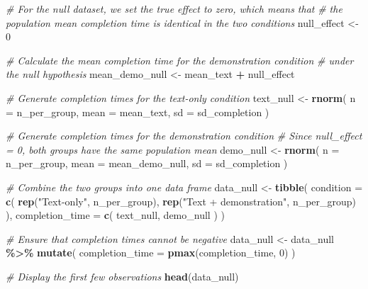 \documentclass[
]{article}
\newenvironment{Shaded}{\begin{snugshade}}{\end{snugshade}}
\newcommand{\AttributeTok}[1]{\textcolor[rgb]{0.13,0.29,0.53}{#1}}
\newcommand{\CommentTok}[1]{\textcolor[rgb]{0.56,0.35,0.01}{\textit{#1}}}
\newcommand{\DecValTok}[1]{\textcolor[rgb]{0.00,0.00,0.81}{#1}}
\newcommand{\FunctionTok}[1]{\textcolor[rgb]{0.13,0.29,0.53}{\textbf{#1}}}
\newcommand{\NormalTok}[1]{#1}
\newcommand{\OtherTok}[1]{\textcolor[rgb]{0.56,0.35,0.01}{#1}}
\newcommand{\SpecialCharTok}[1]{\textcolor[rgb]{0.81,0.36,0.00}{\textbf{#1}}}
\newcommand{\StringTok}[1]{\textcolor[rgb]{0.31,0.60,0.02}{#1}}
\begin{document}
\begin{Shaded}
\begin{Highlighting}[]
\CommentTok{\# For the null dataset, we set the true effect to zero, which means that }
\CommentTok{\# the population mean completion time is identical in the two conditions}
\NormalTok{null\_effect }\OtherTok{\textless{}{-}} \DecValTok{0}

\CommentTok{\# Calculate the mean completion time for the demonstration condition}
\CommentTok{\# under the null hypothesis}
\NormalTok{mean\_demo\_null }\OtherTok{\textless{}{-}}\NormalTok{ mean\_text }\SpecialCharTok{+}\NormalTok{ null\_effect}

\CommentTok{\# Generate completion times for the text{-}only condition}
\NormalTok{text\_null }\OtherTok{\textless{}{-}} \FunctionTok{rnorm}\NormalTok{(}
  \AttributeTok{n =}\NormalTok{ n\_per\_group,}
  \AttributeTok{mean =}\NormalTok{ mean\_text,}
  \AttributeTok{sd =}\NormalTok{ sd\_completion}
\NormalTok{)}

\CommentTok{\# Generate completion times for the demonstration condition}
\CommentTok{\# Since null\_effect = 0, both groups have the same population mean}
\NormalTok{demo\_null }\OtherTok{\textless{}{-}} \FunctionTok{rnorm}\NormalTok{(}
  \AttributeTok{n =}\NormalTok{ n\_per\_group,}
  \AttributeTok{mean =}\NormalTok{ mean\_demo\_null,}
  \AttributeTok{sd =}\NormalTok{ sd\_completion}
\NormalTok{)}

\CommentTok{\# Combine the two groups into one data frame}
\NormalTok{data\_null }\OtherTok{\textless{}{-}} \FunctionTok{tibble}\NormalTok{(}
  \AttributeTok{condition =} \FunctionTok{c}\NormalTok{(}
    \FunctionTok{rep}\NormalTok{(}\StringTok{"Text{-}only"}\NormalTok{, n\_per\_group),}
    \FunctionTok{rep}\NormalTok{(}\StringTok{"Text + demonstration"}\NormalTok{, n\_per\_group)}
\NormalTok{  ),}
  \AttributeTok{completion\_time =} \FunctionTok{c}\NormalTok{(}
\NormalTok{    text\_null,}
\NormalTok{    demo\_null}
\NormalTok{  )}
\NormalTok{)}

\CommentTok{\# Ensure that completion times cannot be negative}
\NormalTok{data\_null }\OtherTok{\textless{}{-}}\NormalTok{ data\_null }\SpecialCharTok{\%\textgreater{}\%}
  \FunctionTok{mutate}\NormalTok{(}
    \AttributeTok{completion\_time =} \FunctionTok{pmax}\NormalTok{(completion\_time, }\DecValTok{0}\NormalTok{)}
\NormalTok{  )}

\CommentTok{\# Display the first few observations}
\FunctionTok{head}\NormalTok{(data\_null)}
\end{Highlighting}
\end{Shaded}
\end{document}
